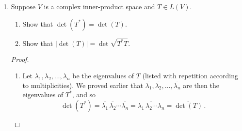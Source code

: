 \documentclass[11pt]{amsart}
\begin{document}
\begin{enumerate}[(1)]
\begin{proof}
\begin{enumerate}
\item $\inner T T \ge 0$ and $\inner T T = 0 \ \Longleftrightarrow \ T = 0$ follow with Exercise 2(a).
Second,
\begin{align*}
  \inner { aR+S } T
  &= \tr \left( (aR+S) T^* \right)
   = \tr \left( aR T^* + S T^* \right)
   = \tr \left( aR T^* \right) + \tr \left( S T^* \right) \\
  &= a \tr \left( R T^* \right) + \tr \left( S T^* \right)
   = a \tr \inner R {T^*} + \inner S {T^*} \, .
\end{align*}
Here we have used that for any linear operator $T$ and $a \in \C$, $\tr(aT) = a \tr(T)$, which is easily seen to be true by writing $T$ in terms of a matrix.

For the final property that will determine that $\inner S T$ is indeed a inner product, we will need that for any $T \in L(V)$,
\[
  \tr(T^*)
   = \sum_{ j=1 }^n \inner{ T^*(\e_j) }{ \e_j }
   = \sum_{ j=1 }^n \inner{ \e_j }{ T(\e_j) }
   = \sum_{ j=1 }^n \overline{ \inner{ T(\e_j) }{ \e_j } }
   = \overline{ \sum_{ j=1 }^n \inner{ T(\e_j) }{ \e_j } }
   = \overline{ \tr(T) } \, .
\]
Thus
\[
  \inner S T
  = \tr(ST^*)
  = \overline{ \tr(TS^*) }
  = \overline{ \inner T S } \, ,
\]
and thus $\inner S T$ satisfies all the properties of an inner product.

\item By Exercise 2(a),
\[
  \inner T T
  = \tr(TT^*)
  = \tr(T^* T)
  = \sum_{ k=1 }^n \norm{ T(\e_k) }^2
  = \sum_{ k=1 }^n \sum_{ j=1 }^n \left| a_{ jk } \right|^2 .
\]
As the statement of the exercise says, this is the square of the standard norm on $L(V)$.
Thus (by Exercise 2 of Homework Set 7) this norm induces the standard inner product on~$L(V)$. \qedhere

\end{enumerate}
\end{proof}

\item Suppose $V$ is a complex inner-product space and $T \in L(V)$.
  \begin{enumerate}
  \item Show that $\det(T^*) = \overline{ \det(T) }$.
  \item Show that $\left| \det(T) \right| = \det \sqrt{ T^* T }$.
  \end{enumerate}

\begin{proof}
\begin{enumerate}

\item Let $\lambda_1, \lambda_2, \dots, \lambda_n$ be the eigenvalues of $T$ (listed with repetition according to multiplicities). We proved earlier that $\overline{\lambda_1}, \overline{\lambda_2}, \dots, \overline{\lambda_n}$ are then the eigenvalues of $T^*$, and so
\[
  \det(T^*)
  = \overline{\lambda_1} \, \overline{\lambda_2} \cdots \overline{\lambda_n}
  = \overline{ \lambda_1 \, \lambda_2 \cdots \lambda_n }
  = \overline{ \det(T) } \, .
\]


\end{enumerate}
\end{proof}
\end{enumerate}
\end{document}

